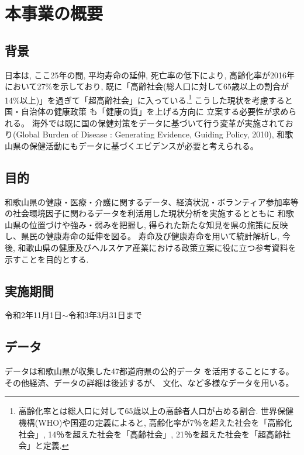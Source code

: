 



\chapter{本事業の概要}
\section{背景}
日本は, ここ25年の間, 平均寿命の延伸, 死亡率の低下により, 高齢化率が2016年において27\%を示しており, 既に「高齢社会(総人口に対して65歳以上の割合が14\%以上)」を過ぎて「超高齢社会」に入っている.\footnote{
	高齢化率とは総人口に対して65歳以上の高齢者人口が占める割合. 世界保健機構(WHO)や国連の定義によると, 高齢化率が7％を超えた社会を「高齢化社会」, 14％を超えた社会を「高齢社会」, 21％を超えた社会を「超高齢社会」と定義.
}
こうした現状を考慮すると
国・自治体の健康政策
も「健康の質」を上げる方向に
立案する必要性が求められる。
海外では既に国の保健対策をデータに基づいて行う変革が実施されており(Global Burden of Disease :  Generating Evidence, Guiding Policy, 2010),
和歌山県の保健活動にもデータに基づくエビデンスが必要と考えられる。



\section{目的}
和歌山県の健康・医療・介護に関するデータ、経済状況・ボランティア参加率等の社会環境因子に関わるデータを利活用した現状分析を実施するとともに
和歌山県の位置づけや強み・弱みを把握し,
得られた新たな知見を県の施策に反映し、県民の健康寿命の延伸を図る。
寿命及び健康寿命を用いて統計解析し,
 今後, 和歌山県の健康及びヘルスケア産業における政策立案に役に立つ参考資料を示すことを目的とする.

\section{実施期間}
令和2年11月1日$\sim$令和3年3月31日まで


\section{データ}
データは和歌山県が収集した47都道府県の公的データ
を活用することにする。
その他経済、データの詳細は後述するが、
文化、など多様なデータを用いる。


